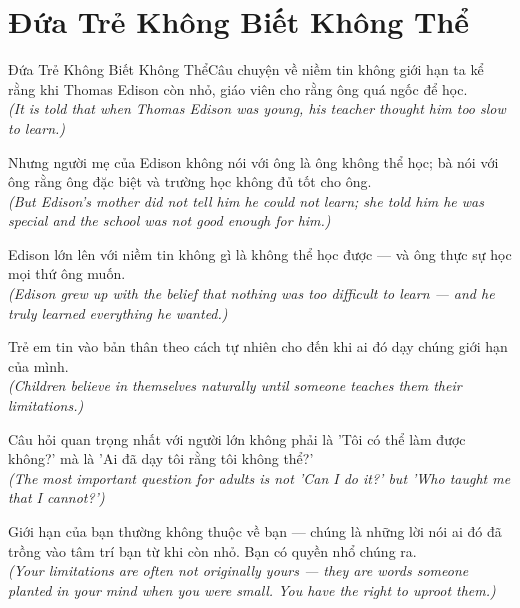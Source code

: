 \section{Đứa Trẻ Không Biết Không Thể}
\begin{truyen}{Đứa Trẻ Không Biết Không Thể}{Câu chuyện về niềm tin không giới hạn}
 ta kể rằng khi Thomas Edison còn nhỏ, giáo viên cho rằng ông quá ngốc để học.\\[4pt]
\textit{(It is told that when Thomas Edison was young, his teacher thought him too slow to learn.)}

Nhưng người mẹ của Edison không nói với ông là ông không thể học; bà nói với ông rằng ông đặc biệt và trường học không đủ tốt cho ông.\\[4pt]
\textit{(But Edison's mother did not tell him he could not learn; she told him he was special and the school was not good enough for him.)}

Edison lớn lên với niềm tin không gì là không thể học được --- và ông thực sự học mọi thứ ông muốn.\\[4pt]
\textit{(Edison grew up with the belief that nothing was too difficult to learn --- and he truly learned everything he wanted.)}

Trẻ em tin vào bản thân theo cách tự nhiên cho đến khi ai đó dạy chúng giới hạn của mình.\\[4pt]
\textit{(Children believe in themselves naturally until someone teaches them their limitations.)}

Câu hỏi quan trọng nhất với người lớn không phải là 'Tôi có thể làm được không?' mà là 'Ai đã dạy tôi rằng tôi không thể?'\\[4pt]
\textit{(The most important question for adults is not 'Can I do it?' but 'Who taught me that I cannot?')}

\end{truyen}
\begin{baihoc}
  Giới hạn của bạn thường không thuộc về bạn --- chúng là những lời nói ai đó đã trồng vào tâm trí bạn từ khi còn nhỏ. Bạn có quyền nhổ chúng ra.\\[4pt]
  \textit{(Your limitations are often not originally yours --- they are words someone planted in your mind when you were small. You have the right to uproot them.)}
\end{baihoc}
